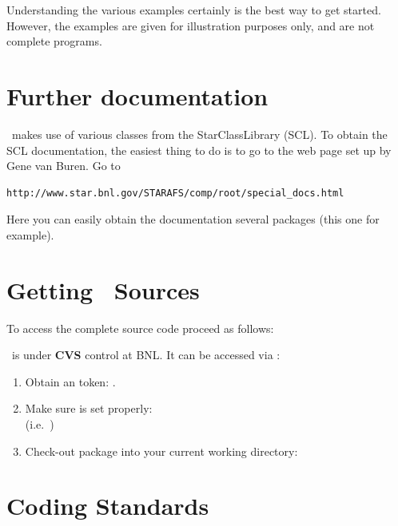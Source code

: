 Understanding the various
examples certainly is the best way to get started. However, the examples
are given for illustration purposes only, and are not complete programs.


\section{Further documentation}
\label{sec:furtherdoc}

\StMcEvent\ makes use of various classes from the StarClassLibrary (SCL).
To obtain the SCL documentation, the easiest thing to do is to go to
the web page set up by Gene van Buren. 
Go to
\begin{verbatim}
http://www.star.bnl.gov/STARAFS/comp/root/special_docs.html
\end{verbatim}
Here you can easily obtain the documentation several packages
(this one for example).
 


\section{Getting \StMcEvent\ Sources}  

To access the complete source code proceed as follows:

\StMcEvent\ is under {\bf CVS} control at BNL.  It can
be accessed via :   
\begin{enumerate}
  \item Obtain an  token: .
  \item Make sure  is set properly:\\ %
    (i.e.~)
  \item Check-out package into your current working directory:\\
\end{enumerate}


\section{Coding Standards}

